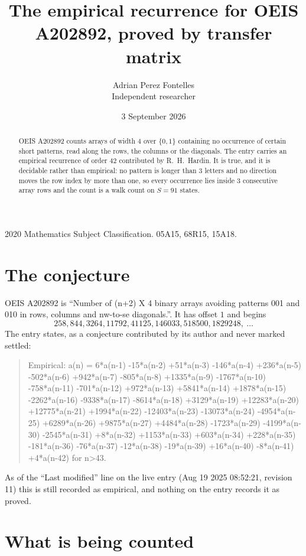 \documentclass[11pt,a4paper]{article}
\title{The empirical recurrence for OEIS A202892, proved by transfer matrix}
\author{Adrian Perez Fontelles\\ \small Independent researcher}
\date{3 September 2026}
\theoremstyle{plain}
\theoremstyle{definition}
\begin{document}
\maketitle

\begin{abstract}
OEIS A202892 counts arrays of width $4$ over $\{0,1\}$ containing no occurrence of certain short
patterns, read along the rows, the columns or the diagonals. The entry carries an empirical
recurrence of order $42$ contributed by R.~H.~Hardin. It is true, and it is decidable
rather than empirical: no pattern is longer than $3$ letters and no direction moves the row
index by more than one, so every occurrence lies inside $3$ consecutive array rows and the
count is a walk count on $S=91$ states.
\end{abstract}

\noindent\small 2020 Mathematics Subject Classification. 05A15, 68R15, 15A18.\normalsize

\section{The conjecture}

OEIS A202892 is ``Number of (n+2) X 4 binary arrays avoiding patterns 001 and 010 in rows, columns and nw-to-se diagonals.''. It has offset $1$ and begins
\[
258, 844, 3264, 11792, 41125, 146033, 518500, 1829248,\ \dots
\]
The entry states, as a conjecture contributed by its author and never marked settled:
\begin{quote}
Empirical: a(n) = 6*a(n-1) -15*a(n-2) +51*a(n-3) -146*a(n-4) +236*a(n-5) -502*a(n-6) +942*a(n-7) -805*a(n-8) +1335*a(n-9) -1767*a(n-10) -758*a(n-11) -701*a(n-12) +972*a(n-13) +5841*a(n-14) +1878*a(n-15) -2262*a(n-16) -9338*a(n-17) -8614*a(n-18) +3129*a(n-19) +12283*a(n-20) +12775*a(n-21) +1994*a(n-22) -12403*a(n-23) -13073*a(n-24) -4954*a(n-25) +6289*a(n-26) +9875*a(n-27) +4484*a(n-28) -1723*a(n-29) -4199*a(n-30) -2545*a(n-31) +8*a(n-32) +1153*a(n-33) +603*a(n-34) +228*a(n-35) -181*a(n-36) -76*a(n-37) -12*a(n-38) -19*a(n-39) +16*a(n-40) -8*a(n-41) +4*a(n-42) for n>43.
\end{quote}
As of the ``Last modified'' line on the live entry (Aug 19 2025 08:52:21, revision 11) this is still
recorded as empirical, and nothing on the entry records it as proved.

\section{What is being counted}
\end{document}
